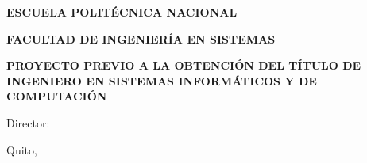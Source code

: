 \begin{titlepage}
  \centering

  {\huge\bf\MakeUppercase{Escuela Politécnica Nacional}}
  \vfill

  {\Large\bf\MakeUppercase{Facultad de Ingeniería en Sistemas}}
  \vfill

  {\large\bf\MakeUppercase{\thetitle}}
  \vfill

  {\bf\MakeUppercase{Proyecto Previo a la Obtención del Título de Ingeniero en
  Sistemas Informáticos y de Computación}}
  \vfill

  {\bf\MakeUppercase{\theauthor}}
  \vfill

  Director:
  \vfill

  Quito, \thedate
  \vfill
\end{titlepage}
